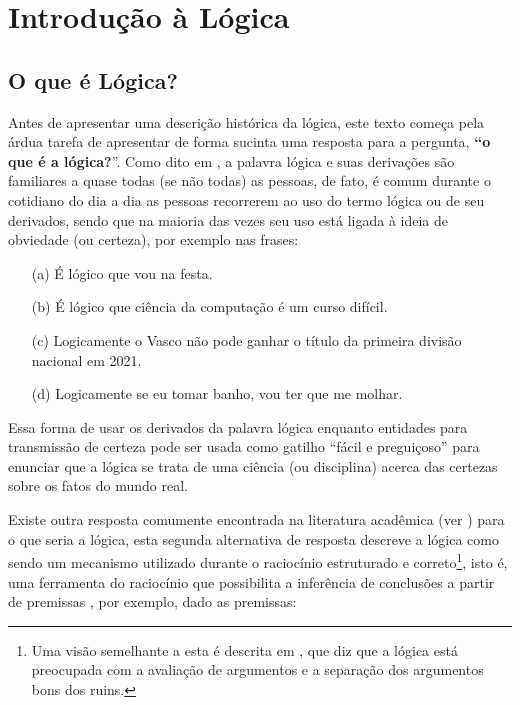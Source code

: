 \chapter{Introdução à Lógica}\label{cap:IntroducaoLogica}

\section{O que é Lógica?}\label{sec:O-que-e-Logica}

Antes de apresentar uma descrição histórica da lógica, este texto começa pela árdua tarefa de apresentar de forma sucinta uma resposta para a pergunta, \textbf{``o que é a lógica?}''. Como dito em \cite{BenjaV1, copi1981}, a palavra lógica e suas derivações são familiares a quase todas (se não todas) as pessoas, de fato, é comum durante o cotidiano do dia a dia as pessoas recorrerem ao uso do termo lógica ou de seu derivados, sendo que na maioria das vezes seu uso está ligada à ideia de obviedade (ou certeza), por exemplo nas frases:

\begin{itemize}
    \item[(a)] É lógico que vou na festa.
    \item[(b)] É lógico que ciência da computação é um curso difícil.
    \item[(c)] Logicamente o Vasco não pode ganhar o título da primeira divisão nacional em 2021.
    \item[(d)] Logicamente se eu tomar banho, vou ter que me molhar.
\end{itemize}

Essa forma de usar os derivados da palavra lógica enquanto entidades para transmissão de certeza pode ser usada como gatilho ``fácil e preguiçoso'' para enunciar que a lógica se trata de uma ciência (ou disciplina) acerca das certezas sobre os fatos do mundo real. 

Existe outra resposta comumente encontrada na literatura acadêmica (ver \cite{abe2002-logica, BenjaV1, joaoPavao2014}) para o que seria a lógica, esta segunda alternativa de resposta  descreve a lógica como sendo um mecanismo utilizado durante o raciocínio estruturado e correto\footnote{Uma visão semelhante a esta é descrita em \cite{magnus2020}, que diz que a lógica está preocupada com a avaliação de argumentos e a separação dos argumentos bons dos ruins.}, isto é, uma ferramenta do raciocínio que possibilita a inferência de conclusões a partir de premissas \cite{abe2002-logica, copi1981, hodges1997, levin2021}, por exemplo, dado as premissas:

